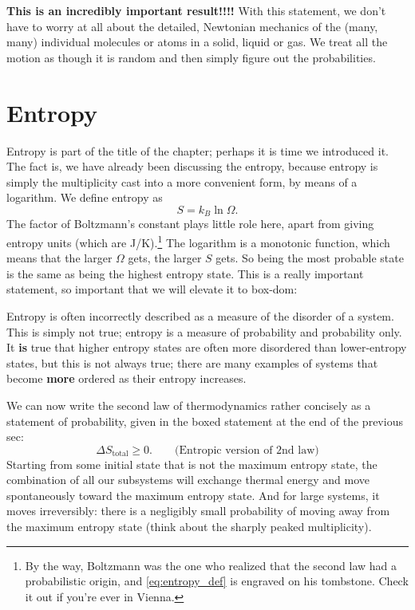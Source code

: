 \textbf{This is an incredibly important result!!!!}  With this
statement, we don't have to worry at all about the detailed,
Newtonian mechanics of the (many, many) individual molecules or
atoms in a solid, liquid or gas.  We treat all the motion as though
it is random and then simply figure out the probabilities.  

\section{Entropy}

Entropy is part of the title of the chapter; perhaps it is time we
introduced it.  The fact is, we have already been discussing the
entropy, because entropy is simply the multiplicity cast into a more
convenient form, by means of a logarithm.  We define entropy as
\begin{equation}
S = k_B\ln\Omega.
\label{eq:entropy_def}
\end{equation}
The factor of Boltzmann's constant plays little role here, apart from
giving entropy units (which are J/K).\footnote{By the way, Boltzmann
was the one who realized that the second law had a probabilistic origin,
and \eqref{eq:entropy_def} is engraved on his tombstone.  Check it
out if you're ever in Vienna.}  The logarithm is a monotonic function,
which means that the larger $\Omega$ gets, the larger $S$ gets.  So being
the most probable state is the same as being the highest entropy state.
This is a really important statement, so important that we will elevate
it to box-dom:

 
Entropy is often incorrectly described as a measure of the disorder
of a system.  This is simply not true; entropy is a measure of
probability and probability only.  It \textbf{is} true that higher
entropy states are often more disordered than lower-entropy states,
but this is not always true; there are many examples
of systems that become \textbf{more} ordered as their
entropy increases.

We can now write the second law of thermodynamics rather concisely as
a statement of probability, given in the boxed statement at the end of
the previous sec:
\begin{equation}
\Delta S_\text{total} \geq 0. \qquad\text{(Entropic version of 2nd law)}
\end{equation}
Starting from some initial state that is not the maximum entropy
state, the combination of all our subsystems will exchange thermal
energy and move spontaneously toward the maximum entropy state.  And
for large systems, it moves irreversibly: there is a negligibly small
probability of moving away from the maximum entropy state
(think about the sharply peaked multiplicity).

